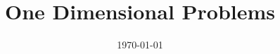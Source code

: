 \documentclass[%
notitlepage,
]{revtex4-1}
\begin{document}
\preprint{}

\title[]{One Dimensional Problems}%


\date{\today}%

\begin{abstract}

\end{abstract}

\maketitle
\end{document}

